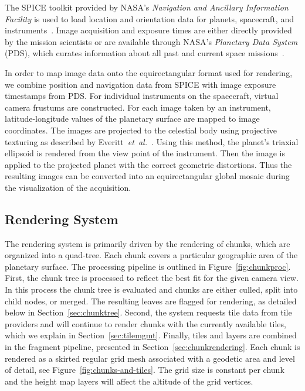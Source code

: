 \documentclass[journal]{vgtc}                %
\newcommand{\fig}[1]{Figure~\ref{fig:#1}}
\newcommand{\etal}{\emph{et~al.}}
\begin{document}
The SPICE toolkit provided by NASA's \emph{Navigation and Ancillary Information Facility} is used to load location and orientation data for planets, spacecraft, and instruments~\cite{acton1996ancillary}.
Image acquisition and exposure times are either directly provided by the mission scientists or are available through NASA's \emph{Planetary Data System} (PDS), which curates information about all past and current space missions~\cite{mcmahon1996overview}.

In order to map image data onto the equirectangular format used for rendering, we combine position and navigation data from SPICE with image exposure timestamps from PDS. For individual instruments on the spacecraft, virtual camera frustums are constructed. For each image taken by an instrument, latitude-longitude values of the planetary surface are mapped to image coordinates.
The images are projected to the celestial body using projective texturing as described by Everitt~\etal~\cite{Everitt:2001tg}.
Using this method, the planet's triaxial ellipsoid is rendered from the view point of the instrument. Then the image is applied to the projected planet with the correct geometric distortions. Thus the resulting images can be converted into an equirectangular global mosaic during the visualization of the acquisition.

\subsection{Rendering System} \label{sec:renderingsystem}
The rendering system is primarily driven by the rendering of chunks, which are organized into a quad-tree. Each chunk covers a particular geographic area of the planetary surface. The processing pipeline is outlined in \fig{chunkproc}. First, the chunk tree is processed to reflect the best fit for the given camera view. In this process the chunk tree is evaluated and chunks are either culled, split into child nodes, or merged. The resulting leaves are flagged for rendering, as detailed below in Section~\ref{sec:chunktree}. Second, the system requests tile data from tile providers and will continue to render chunks with the currently available tiles, which we explain in Section~\ref{sec:tilemgmt}. Finally, tiles and layers are combined in the fragment pipeline, presented in Section~\ref{sec:chunkrendering}.
Each chunk is rendered as a skirted regular grid mesh associated with a geodetic area and level of detail, see \fig{chunks-and-tiles}. The grid size is constant per chunk and the height map layers will affect the altitude of the grid vertices.
\end{document}
